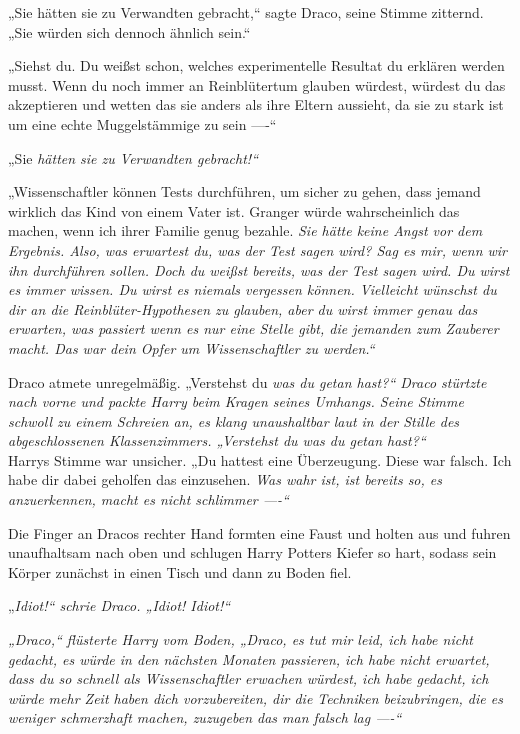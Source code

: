 {„Sie hätten sie zu Verwandten gebracht,“ sagte Draco, seine Stimme zitternd. „Sie würden sich dennoch ähnlich sein.“

„Siehst du. Du weißst schon, welches experimentelle Resultat du erklären werden musst. Wenn du noch immer an Reinblütertum glauben würdest, würdest du das akzeptieren und wetten das sie anders als ihre Eltern aussieht, da sie zu stark ist um eine echte Muggelstämmige zu sein ----“

„Sie \emph{hätten sie zu Verwandten gebracht!“}

„Wissenschaftler können Tests durchführen, um sicher zu gehen, dass jemand wirklich das Kind von einem Vater ist. Granger würde wahrscheinlich das machen, wenn ich ihrer Familie genug bezahle. \emph{Sie hätte keine Angst vor dem Ergebnis. Also, was erwartest du, was der Test sagen wird? Sag es mir, wenn wir ihn durchführen sollen. Doch du weißst bereits, was der Test sagen wird. Du wirst es immer wissen. Du wirst es niemals vergessen können. Vielleicht wünschst du dir an die Reinblüter-Hypothesen zu glauben, aber du wirst immer genau das erwarten, was passiert wenn es nur eine Stelle gibt, die jemanden zum Zauberer macht. Das war dein Opfer um Wissenschaftler zu werden.“}

Draco atmete unregelmäßig. „Verstehst du \emph{was du getan hast?“ Draco stürtzte nach vorne und packte Harry beim Kragen seines Umhangs. Seine Stimme schwoll zu einem Schreien an, es klang unaushaltbar laut in der Stille des abgeschlossenen Klassenzimmers. „\emph{Verstehst du was du getan hast?“}}\\ Harrys Stimme war unsicher. „Du hattest eine Überzeugung. Diese war falsch. Ich habe dir dabei geholfen das einzusehen. \emph{Was wahr ist, ist bereits so, es anzuerkennen, macht es nicht schlimmer ----“}

Die Finger an Dracos rechter Hand formten eine Faust und holten aus und fuhren unaufhaltsam nach oben und schlugen Harry Potters Kiefer so hart, sodass sein Körper zunächst in einen Tisch und dann zu Boden fiel.

„\emph{Idiot!“ schrie Draco. „\emph{Idiot! Idiot!“}}

\emph{„Draco,“ flüsterte Harry vom Boden, „Draco, es tut mir leid, ich habe nicht gedacht, es würde in den nächsten Monaten passieren, ich habe nicht erwartet, dass du so schnell als Wissenschaftler erwachen würdest, ich habe gedacht, ich würde mehr Zeit haben dich vorzubereiten, dir die Techniken beizubringen, die es weniger schmerzhaft machen, zuzugeben das man falsch lag ----“}

}
